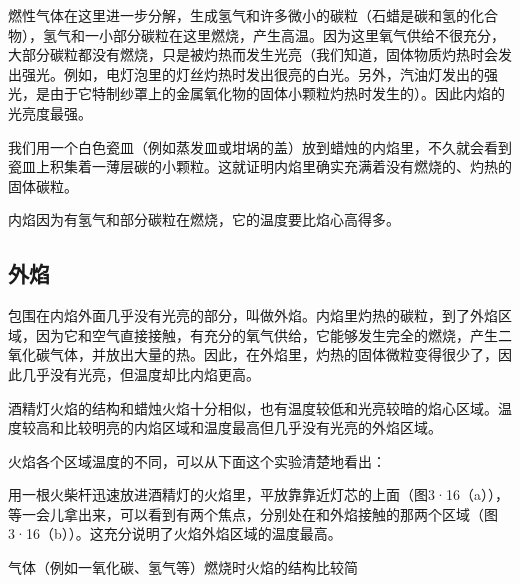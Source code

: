燃性气体在这里进一步分解，生成氢气和许多微小的碳粒（石蜡是碳和氢的化合物），氢气和一小部分碳粒在这里燃烧，产生高温。因为这里氧气供给不很充分，大部分碳粒都没有燃烧，只是被灼热而发生光亮（我们知道，固体物质灼热时会发出强光。例如，电灯泡里的灯丝灼热时发出很亮的白光。另外，汽油灯发出的强光，是由于它特制纱罩上的金属氧化物的固体小颗粒灼热时发生的）。因此内焰的光亮度最强。

我们用一个白色瓷皿（例如蒸发皿或坩埚的盖）放到蜡烛的内焰里，不久就会看到瓷皿上积集着一薄层碳的小颗粒。这就证明内焰里确实充满着没有燃烧的、灼热的固体碳粒。

内焰因为有氢气和部分碳粒在燃烧，它的温度要比焰心高得多。

\subsection{外焰}

包围在内焰外面几乎没有光亮的部分，叫做外焰。内焰里灼热的碳粒，到了外焰区域，因为它和空气直接接触，有充分的氧气供给，它能够发生完全的燃烧，产生二氧化碳气体，并放出大量的热。因此，在外焰里，灼热的固体微粒变得很少了，因此几乎没有光亮，但温度却比内焰更高。

酒精灯火焰的结构和蜡烛火焰十分相似，也有温度较低和光亮较暗的焰心区域。温度较高和比较明亮的内焰区域和温度最高但几乎没有光亮的外焰区域。

火焰各个区域温度的不同，可以从下面这个实验清楚地看出：

用一根火柴杆迅速放进酒精灯的火焰里，平放靠靠近灯芯的上面（图3·16（a）），等一会儿拿出来，可以看到有两个焦点，分别处在和外焰接触的那两个区域（图3·16（b））。这充分说明了火焰外焰区域的温度最高。

气体（例如一氧化碳、氢气等）燃烧时火焰的结构比较简

